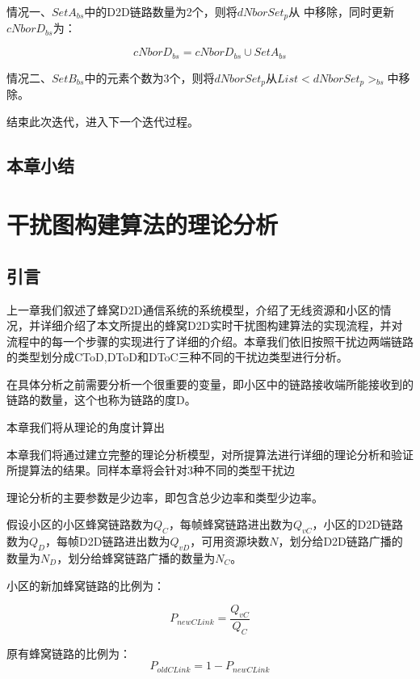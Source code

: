 \documentclass[figurelist,tablelist,algorithmlist,nomlist,masters]{seuthesix}
\begin{document}
	情况一、$Set{A_{bs}}$中的D2D链路数量为2个，则将$dNborSet_{p}$从 中移除，同时更新$cNborD_{bs}$为：
	
	\begin{equation}\label{eq2.29}
	cNborD_{bs} = cNborD_{bs} \cup Set{A_{bs}}
	\end{equation}
	
	情况二、$Set{B_{bs}}$中的元素个数为3个，则将$dNborSet_{p}$从$List < dNborSet_{p}{ > _{bs}}$中移除。
	
	结束此次迭代，进入下一个迭代过程。
	
	\section{本章小结}
	
	
	\chapter{干扰图构建算法的理论分析}
	\section{引言}
	上一章我们叙述了蜂窝D2D通信系统的系统模型，介绍了无线资源和小区的情况，并详细介绍了本文所提出的蜂窝D2D实时干扰图构建算法的实现流程，并对流程中的每一个步骤的实现进行了详细的介绍。本章我们依旧按照干扰边两端链路的类型划分成CToD,DToD和DToC三种不同的干扰边类型进行分析。
	
	在具体分析之前需要分析一个很重要的变量，即小区中的链路接收端所能接收到的链路的数量，这个也称为链路的度D。
	
	
	本章我们将从理论的角度计算出
	
	本章我们将通过建立完整的理论分析模型，对所提算法进行详细的理论分析和验证所提算法的结果。同样本章将会针对3种不同的类型干扰边
	
	理论分析的主要参数是少边率，即包含总少边率和类型少边率。
	
	假设小区的小区蜂窝链路数为$Q_C$，每帧蜂窝链路进出数为$Q_{vC}$，小区的D2D链路数为$Q_D$，每帧D2D链路进出数为$Q_{vD}$，可用资源块数$N$，划分给D2D链路广播的数量为$N_D$，划分给蜂窝链路广播的数量为$N_C$。
	
	
	
	小区的新加蜂窝链路的比例为：
	
	\begin{equation}\label{eq3.1}
	{P_{newCLink}} = \frac{{Q_{vC}}}{{Q_C}}
	\end{equation}
	
	原有蜂窝链路的比例为：
	\begin{equation}\label{eq3.2}
	{P_{oldCLink}} = 1 - {P_{newCLink}}
	\end{equation}
	
\end{document}
